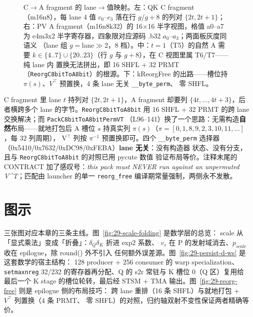 \begin{figure}[H]
\caption{C$\to$A fragment 的 lane$\to$值映射。左：QK C
fragment（m16n8），每 lane 4 值 $c_0$--$c_3$ 落在行 $g$/$g{+}8$ 的列对
$\{2t,2t{+}1\}$；右：PV A fragment（m16n8k32）的 16$\times$16 半字视图，格值
a0--a7 为 e4m3x2 半字寄存器，四象限对应源码 .b32 $a_0$--$a_3$；两面板灰度同语义
（lane 组 $g=$lane$\gg$2，8 档）。中：$t{=}1$（T5）的自然 A 需要
$k\in\{4..7\}\cup\{20..23\}$（行 $g$ 与 $g{+}8$），在 C 视图里属 T6/T7——纯 lane 内
置换无法拼出，即 16 SHFL + 32 PRMT（\texttt{ReorgC8bitToA8bit}）的根源。下：kReorgFree
的出路——槽位持 $\pi(s)$、$V^{\top}$ 预置换，4 条 lane 无关 \texttt{\_\_byte\_perm}、
零 SHFL。}
\label{fig:29-frag-map}
\end{figure}

C fragment 里 lane $t$ 持列对 $\{2t,2t{+}1\}$，A fragment 却要列
$\{4t,\dots,4t{+}3\}$，后者横跨多个 lane 的字节。\texttt{ReorgC8bitToA8bit}
用 16 SHFL + 32 PRMT 的跨 lane 交换解决；而 \texttt{PackC8bitToA8bitPermVT}
（L96--141）换了一个思路：无需构造\textbf{自然}布局——就地打包后 A 槽位
$s$ 持真实列 $\pi(s)$（$\pi = [0,1,8,9, 2,3,10,11,\dots]$，每 32 列周期），
V$^{\top}$ 列按 $\pi^{-1}$ 预置换即可。四个 \texttt{\_\_byte\_perm}
选择器（0x5410/0x7632/0xDC98/0xFEBA）\textbf{lane 无关}：没有构造器
状态、没有分支，且与 \texttt{ReorgC8bitToA8bit} 的对照已用 pycute 数值
验证布局等价。注释末尾的 CONTRACT 加了感叹号：\textit{this pack must
NEVER run against an unpermuted V\^{}T}；匹配由 launcher 的单一
\texttt{reorg\_free} 编译期常量强制，两侧永不发散。

\section{图示}

三张图对应本章的三条主线。图~\ref{fig:29-scale-folding} 是数学层的总览：
scale 从「显式乘法」变成「折叠」：$\delta_Q\delta_K$ 折进 exp2 系数、
$v_s$ 在 P 的发射域消去、$p_{scale}$ 收在 epilogue，除 round() 外不引入
任何额外误差源。图~\ref{fig:29-persist-d-ws} 是这套数学的宿主结构：
128 producer + 256 consumer 的 warp specialization、\texttt{setmaxnreg}
32/232 的寄存器再分配、Q 的 s2r 常驻与 K 槽位 0（Q 区）复用给最后一个
K stage 的槽位轮转，最后经
STSM + TMA 输出。图~\ref{fig:29-reorg-free} 则是 epilogue 侧的布局技巧：
跨 lane 重排（16 条 SHFL）与就地打包 + $V^{\top}$ 列置换（4 条 PRMT、
零 SHFL）的对照，归约轴双射不变性保证两者精确等价。

